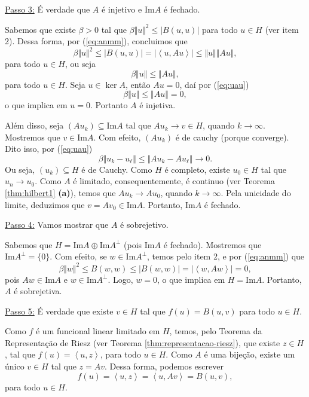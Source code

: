 \documentclass[a4paper, 11pt]{book}
\theoremstyle{definition}
\begin{document}
\begin{prf}
    \underline{Passo 3:} É verdade que $A$ é injetivo e $\mathrm{Im}A$ é fechado.

    Sabemos que existe $\beta > 0$ tal que $\beta \Vert u \Vert^2 \leqslant |B(u,u)|$ para todo $u \in H$ (ver item 2). Dessa forma, por (\ref{eq:anmm}), concluimos que
    \[
        \beta \Vert u \Vert^2 \leqslant |B(u,u)| = | \left\langle u, Au \right\rangle | \leqslant \Vert u \Vert \Vert Au \Vert,
    \]
    para todo $u \in H$, ou seja
    \begin{equation} \label{eq:uau}
        \beta \Vert u \Vert \leqslant \Vert Au \Vert,
    \end{equation}
    para todo $u \in H$.
    Seja $u \in \ker A$, então $Au = 0$, daí por (\ref{eq:uau})
    \[
        \beta \Vert u \Vert \leqslant \Vert Au \Vert = 0,
    \]
    o que implica em $u = 0$.
    Portanto $A$ é injetiva.

    Além disso, seja $(Au_k) \subseteq \mathrm{Im} A$ tal que $A u_k \to v \in H$, quando $k \to \infty$.
    Mostremos que $v \in \mathrm{Im}A$.
    Com efeito, $(Au_k)$ é de cauchy (porque converge). Dito isso, por (\ref{eq:uau})
    \[
        \beta \Vert u_k - u_\ell \Vert \leqslant \Vert Au_k - Au_\ell \Vert \to 0.
    \]
    Ou seja, $(u_k) \subseteq H$ é de Cauchy.
    Como $H$ é completo, existe $u_0 \in H$ tal que $u_n \to u_0$. Como $A$ é limitado, consequentemente, é continuo (ver Teorema \ref{thm:hilbert1} \textbf{(a)}), temos que $Au_k \to Au_0$, quando $k \to \infty$.
    Pela unicidade do limite, deduzimos que $v = Av_0 \in \mathrm{Im}A$.
    Portanto, $\mathrm{Im}A$ é fechado.

    \underline{Passo 4:} Vamos mostrar que $A$ é sobrejetivo.

    Sabemos que $H = \mathrm{Im}A \oplus \mathrm{Im}A^\perp$ (pois $\mathrm{Im}A$ é fechado). Mostremos que $\mathrm{Im}A^\perp = \{0\}$.
    Com efeito, se $w \in \mathrm{Im}A^\perp$, temos pelo item 2, e por (\ref{eq:anmm}) que
    \[
        \beta \Vert w \Vert^2 \leqslant B(w,w) \leqslant | B(w,w) | = | \left\langle w, Aw \right\rangle | = 0,
    \]
    pois $Aw \in \mathrm{Im}A$ e $w \in \mathrm{Im}A^\perp$.
    Logo, $w = 0$, o que implica em $H = \mathrm{Im}A$.
    Portanto, $A$ é sobrejetiva.

    \underline{Passo 5:} É verdade que existe $v \in H$ tal que $f(u) = B(u,v)$ para todo $u \in H$.

    Como $f$ é um funcional linear limitado em $H$, temos, pelo Teorema da Representação de Riesz (ver Teorema \ref{thm:representacao-riesz}), que existe $z \in H$, tal que $f(u) = \left\langle u, z \right\rangle$, para todo $u \in H$.
    Como $A$ é uma bijeção, existe um único $v \in H$ tal que $z = Av$. Dessa forma, podemos escrever
    \begin{equation} \label{eq:annn}
        f(u) = \left\langle u,z \right\rangle = \left\langle u, Av \right\rangle = B(u,v),
    \end{equation}
    para todo $u \in H$.


\end{prf}
\end{document}
